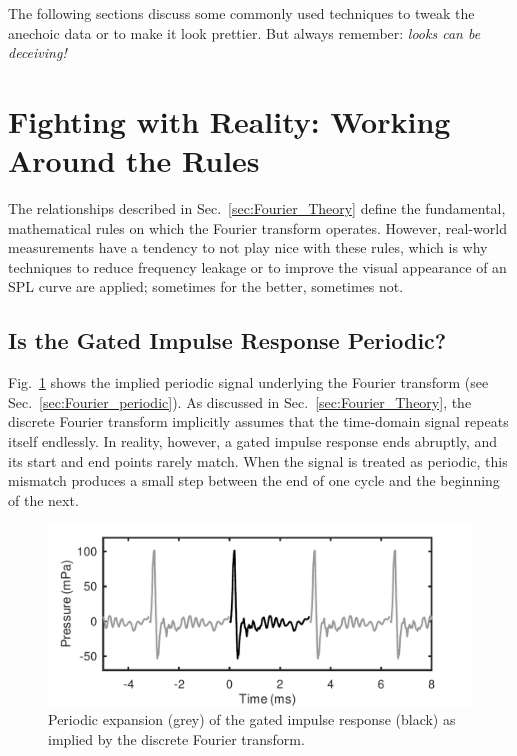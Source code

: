 \documentclass[12pt,a4paper]{article}
\providecommand{\seclabel}[1]{\label{sec:#1}}
\providecommand{\secn}[1]{Sec.~\ref{sec:#1}}
\providecommand{\figlabel}[1]{\label{fig:#1}}
\providecommand{\figr}[1]{Fig.~\ref{fig:#1}}
\begin{document}
The following sections discuss some commonly used techniques to tweak the anechoic data or to make it look prettier. But always remember: \emph{looks can be deceiving!}


\section{Fighting with Reality: Working Around the Rules}

The relationships described in \secn{Fourier_Theory} define the fundamental, mathematical rules on which the Fourier transform operates. However, real-world measurements have a tendency to not play nice with these rules, which is why techniques to reduce frequency leakage or to improve the visual appearance of an SPL curve are applied; sometimes for the better, sometimes not.


\subsection{Is the Gated Impulse Response Periodic?}\seclabel{windowing}

\figr{FIGURE3} shows the implied periodic signal underlying the Fourier transform (see \secn{Fourier_periodic}). As discussed in \secn{Fourier_Theory}, the discrete Fourier transform implicitly assumes that the time-domain signal repeats itself endlessly. In reality, however, a gated impulse response ends abruptly, and its start and end points rarely match. When the signal is treated as periodic, this mismatch produces a small step between the end of one cycle and the beginning of the next.

\begin{figure}[tbp]
  \begin{center}
    \includegraphics[width=\textwidth]{FIGURE3}
    \caption{Periodic expansion (grey) of the gated impulse response (black) as implied by the discrete Fourier transform.}
    \figlabel{FIGURE3}
  \end{center}
\end{figure}
\end{document}
